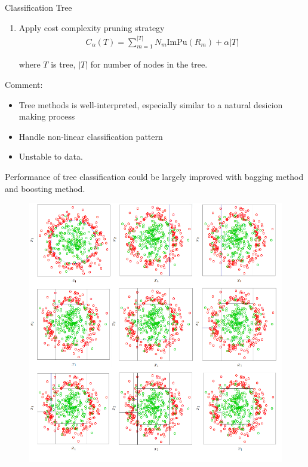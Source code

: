 \begin{algorithm}{Classification Tree}
\begin{enumerate}[topsep=2pt,itemsep=2pt]
        \item Apply cost complexity pruning strategy
        \begin{align}
            C_\alpha (T) =\sum_{m=1}^{|T|}N_m\mathrm{ImPu}(R_m)+\alpha |T|
        \end{align}
        
        where $ T $ is tree, $ |T| $ for number of nodes in the tree.
        
    \end{enumerate}
    
        
    
\end{algorithm}
    

    Comment:
\begin{itemize}[topsep=2pt,itemsep=0pt]
    \item Tree methods is well-interpreted, especially similar to a natural desicion making process
    \item Handle non-linear classification pattern
    \item Unstable to data.
\end{itemize}

    Performance of tree classification could be largely improved with bagging method and boosting method.

\begin{figure}[H]
    \centering
    \includegraphics[width=0.8\linewidth]{sections/images/tree.png}
    \caption{}
    \label{}
\end{figure}


